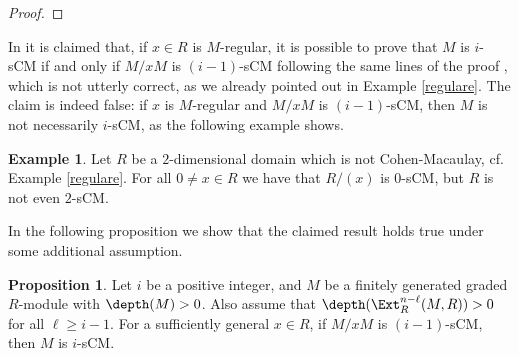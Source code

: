 \documentclass[12pt]{amsart}
\theoremstyle{definition}
\newtheorem{proposition}[theorem]{Proposition}
\theoremstyle{definition}
\newtheorem{example}[theorem]{Example}
\newcommand{\m}{\mathfrak{m}}
\renewcommand{\leq}{\leqslant}
\renewcommand{\geq}{\geqslant}
\begin{document}
\begin{proof}

\end{proof}


In \cite{SS17} it is claimed that, if $x \in R$ is $M$-regular, it is possible to prove that $M$ is $i$-sCM if and only if $M/xM$ is $(i-1)$-sCM following the same lines of the  proof \cite[Theorem 4.7]{Sch99}, which is not utterly correct, as we already pointed out in Example \ref{regulare}.  The claim  is indeed false: if $x$ is $M$-regular and $M/xM$ is $(i-1)$-sCM, then $M$ is not necessarily $i$-sCM, as the following example shows.



\begin{example}
Let $R$ be a $2$-dimensional domain which is not Cohen-Macaulay, cf. Example \ref{regulare}. For all $0 \ne x \in R$  we have that $R/(x)$ is $0$-sCM, but $R$ is not even $2$-sCM.
\end{example}
\noindent
In the following proposition we show that the claimed result holds true under some additional assumption.

\begin{proposition} \label{Ale}
 Let $i$ be a positive integer, and $M$ be a finitely generated graded $R$-module with $\depth(M)> 0$. Also assume that $\depth(\Ext^{n-\ell}_R(M,R))>0$ for all $\ell \geq i-1$. For a sufficiently general $x\in R$, if $M/xM$ is $(i-1)$-sCM, then $M$ is $i$-sCM.
\end{proposition}
\end{document}
